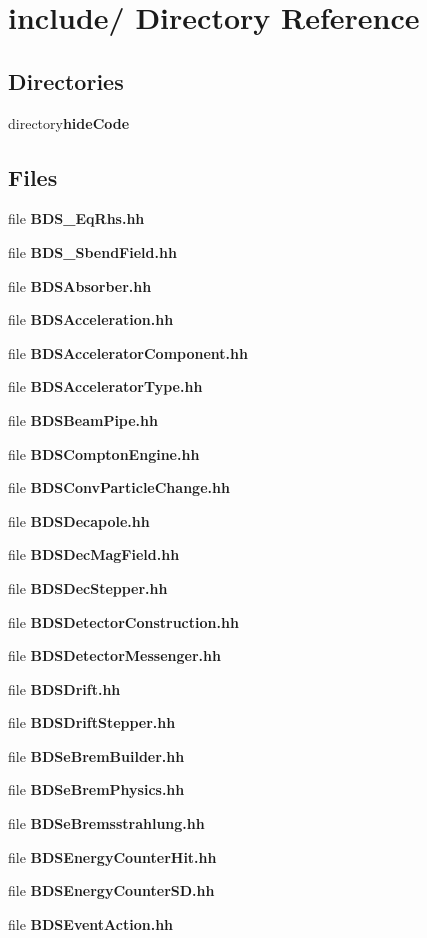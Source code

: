 \section{include/ Directory Reference}
\label{dir_000000}
\subsection*{Directories}
\begin{CompactItemize}
\item 
directory{\bf hide\-Code}
\end{CompactItemize}
\subsection*{Files}
\begin{CompactItemize}
\item 
file {\bf BDS_EqRhs.hh}
\item 
file {\bf BDS_SbendField.hh}
\item 
file {\bf BDSAbsorber.hh}
\item 
file {\bf BDSAcceleration.hh}
\item 
file {\bf BDSAcceleratorComponent.hh}
\item 
file {\bf BDSAcceleratorType.hh}
\item 
file {\bf BDSBeamPipe.hh}
\item 
file {\bf BDSComptonEngine.hh}
\item 
file {\bf BDSConvParticleChange.hh}
\item 
file {\bf BDSDecapole.hh}
\item 
file {\bf BDSDecMagField.hh}
\item 
file {\bf BDSDecStepper.hh}
\item 
file {\bf BDSDetectorConstruction.hh}
\item 
file {\bf BDSDetectorMessenger.hh}
\item 
file {\bf BDSDrift.hh}
\item 
file {\bf BDSDriftStepper.hh}
\item 
file {\bf BDSeBremBuilder.hh}
\item 
file {\bf BDSeBremPhysics.hh}
\item 
file {\bf BDSeBremsstrahlung.hh}
\item 
file {\bf BDSEnergyCounterHit.hh}
\item 
file {\bf BDSEnergyCounterSD.hh}
\item 
file {\bf BDSEventAction.hh}

\end{CompactItemize}
